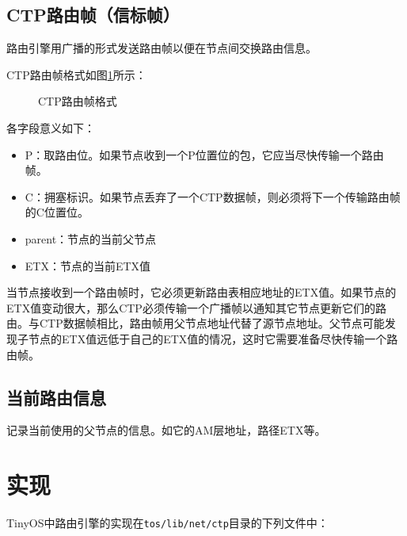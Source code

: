 \subsection{CTP路由帧（信标帧）}
路由引擎用广播的形式发送路由帧以便在节点间交换路由信息。

CTP路由帧格式如图\ref{ctp-route-frame}所示：

\begin{figure}[ht]
\centering
{}
\caption{CTP路由帧格式}\label{ctp-route-frame}
\end{figure}

各字段意义如下：
\vspace{-10pt}
\begin{itemize}
	\item P：取路由位。如果节点收到一个P位置位的包，它应当尽快传输一个路由帧。
	\item C：拥塞标识。如果节点丢弃了一个CTP数据帧，则必须将下一个传输路由帧的C位置位。
	\item parent：节点的当前父节点
	\item ETX：节点的当前ETX值
\end{itemize}
\vspace{-10pt}
当节点接收到一个路由帧时，它必须更新路由表相应地址的ETX值。如果节点的ETX值变动很大，那么CTP必须传输一个广播帧以通知其它节点更新它们的路由。与CTP数据帧相比，路由帧用父节点地址代替了源节点地址。父节点可能发现子节点的ETX值远低于自己的ETX值的情况，这时它需要准备尽快传输一个路由帧。

\subsection{当前路由信息}
记录当前使用的父节点的信息。如它的AM层地址，路径ETX等。

\section{实现}
TinyOS中路由引擎的实现在\texttt{tos/lib/net/ctp}目录的下列文件中：

